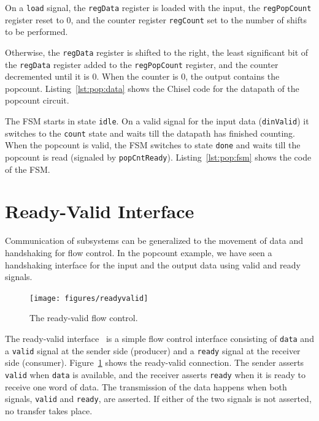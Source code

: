 \documentclass[%
    10pt,
    headinclude, footexclude,
    openright, %
    notitlepage,
    cleardoubleempty,
    headsepline,
    pointlessnumbers,
    bibtotoc, idxtotoc,
    ]{scrbook}
\newcommand{\code}[1]{{\small{\texttt{#1}}}}
\begin{document}
On a \code{load} signal, the \code{regData} register is loaded with the input,
the \code{regPopCount} register reset to 0, and the counter register \code{regCount}
set to the number of shifts to be performed.


Otherwise, the \code{regData} register is shifted to the right, the least significant bit
of the \code{regData} register added to the \code{regPopCount} register, and the counter
decremented until it is 0. When the counter is 0, the output contains the popcount.
Listing~\ref{lst:pop:data} shows the Chisel code for the datapath of the popcount
circuit.

The FSM starts in state \code{idle}. On a valid signal for the input data (\code{dinValid}) it
switches to the \code{count} state and waits till the datapath has finished counting.
When the popcount is valid, the FSM switches to state \code{done} and waits till the
popcount is read (signaled by \code{popCntReady}).
Listing~\ref{lst:pop:fsm} shows the code of the FSM.


\section{Ready-Valid Interface}

Communication of subsystems can be generalized to the movement
of data and handshaking for flow control. In the popcount example,
we have seen a handshaking interface for the input and the output data
using valid and ready signals.

\begin{figure}
  \centering
  \texttt{[image: figures/readyvalid]}
  \caption{The ready-valid flow control.}
  \label{fig:readyvalid}
\end{figure}

The ready-valid interface~\cite[p.~480]{dally:vhdl:2016} is a simple flow
control interface consisting of \code{data} and a \code{valid} signal at the
sender side (producer) and a \code{ready} signal at the receiver side (consumer).
Figure~\ref{fig:readyvalid} shows the ready-valid connection.
The sender asserts \code{valid} when \code{data} is available,
and the receiver asserts \code{ready} when it is ready to receive one word
of data. The transmission of the data happens when both signals, \code{valid}
and \code{ready}, are asserted. If either of the two signals is not asserted,
no transfer takes place.
\end{document}
